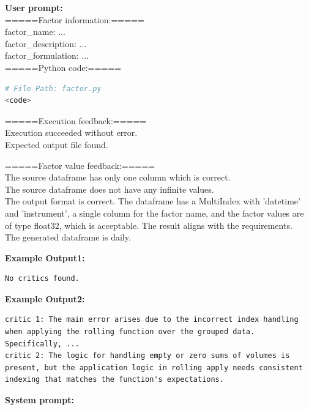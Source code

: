 \documentclass{article}
\begin{document}
\begin{tcolorbox}[
  colback=gray!5, 
  colframe=gray!80,
  title style={fontupper=\bfseries\large},
  title=Implementation Prompt – Factor-Oriented – Code Implementation,
  breakable]
\textcolor{blue!60!black}{\textbf{User prompt:}}\\

=====Factor information:=====\\
factor\_name: ...\\
factor\_description: ...\\
factor\_formulation: ...\\

=====Python code:=====
\begin{lstlisting}[language=Python]
# File Path: factor.py
<code>
\end{lstlisting}

=====Execution feedback:=====\\
Execution succeeded without error.\\
Expected output file found.

=====Factor value feedback:=====\\
The source dataframe has only one column which is correct.\\
The source dataframe does not have any infinite values.\\
The output format is correct. The dataframe has a MultiIndex with 'datetime' and 'instrument', a single column for the factor name, and the factor values are of type float32, which is acceptable. The result aligns with the requirements.\\
The generated dataframe is daily.

\vspace{1mm}
\hrulefill
\vspace{1mm}

\textcolor{blue!60!black}{\textbf{Example Output1:}}
\begin{lstlisting}
No critics found.
\end{lstlisting}

\textcolor{blue!60!black}{\textbf{Example Output2:}}
\begin{lstlisting}
critic 1: The main error arises due to the incorrect index handling when applying the rolling function over the grouped data. Specifically, ...
critic 2: The logic for handling empty or zero sums of volumes is present, but the application logic in rolling apply needs consistent indexing that matches the function's expectations.
\end{lstlisting}
\vspace{1mm}
\hrulefill
\vspace{1mm}

\textcolor{blue!60!black}{\textbf{System prompt:}}\\


\end{tcolorbox}
\end{document}
